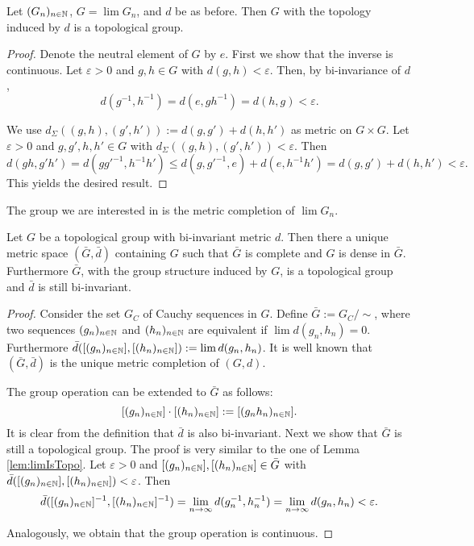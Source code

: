 \begin{lemma}\label{lem:limIsTopo}
Let $(G_n)_{n\in\mathbb{N}}$, $G=\lim G_n$, and $d$ be as before. Then $G$ with the topology induced by $d$ is a topological group.
\end{lemma}
\begin{proof}
Denote the neutral element of $G$ by $e$. First we show that the inverse is continuous. Let $\varepsilon>0$ and $g,h\in G$ with $d(g,h)<\varepsilon$. Then, by bi-invariance of $d$,
\[d(g^{-1},h^{-1})=d(e,gh^{-1})=d(h,g)<\varepsilon.\]

We use $d_\Sigma((g,h),(g',h')):=d(g,g')+d(h,h')$ as metric on $G\times G$. Let $\varepsilon>0$ and $g,g',h,h'\in G$ with $d_\Sigma((g,h),(g',h'))<\varepsilon$. Then
\[d(gh,g'h')=d(gg'^{-1},h^{-1}h')\leq d(g,g'^{-1},e)+d(e,h^{-1}h')=d(g,g')+d(h,h')<\varepsilon.\]
This yields the desired result.
\end{proof}


The group we are interested in is the metric completion of $\lim G_n$. 
\begin{lemma}\label{lem:climIsTopo}
Let $G$ be a topological group with bi-invariant metric $d$. Then there a unique metric space $(\bar G,\bar d)$ containing $G$ such that $\bar G$ is complete and $G$ is dense in $\bar G$. Furthermore $\bar G$, with the group structure induced by $G$, is a topological group and $\bar d$ is still bi-invariant.
\end{lemma}
\begin{proof}
Consider the set $G_C$ of Cauchy sequences in $G$. Define $\bar G:=G_C/\sim$, where two sequences $(g_n)_{n\in\mathbb{N}}$ and $(h_n)_{n\in\mathbb{N}}$ are equivalent if $\lim d(g_n,h_n)=0$. Furthermore $\bar d([(g_n)_{n\in\mathbb{N}}],[(h_n)_{n\in\mathbb{N}}]):=\lim d(g_n,h_n)$. It is well known that $(\bar G,\bar d)$ is the unique metric completion of $(G,d)$.

The group operation can be extended to $\bar G$ as follows:
\[[(g_n)_{n\in\mathbb{N}}]\cdot[(h_n)_{n\in\mathbb{N}}]:=[(g_nh_n)_{n\in\mathbb{N}}].\]
It is clear from the definition that $\bar d$ is also bi-invariant. Next we show that $\bar G$ is still a topological group. 
The proof is very similar to the one of Lemma \ref{lem:limIsTopo}.
Let $\varepsilon>0$ and $[(g_n)_{n\in\mathbb{N}}],[(h_n)_{n\in\mathbb{N}}]\in\bar G$ with $\bar d([(g_n)_{n\in\mathbb{N}}],[(h_n)_{n\in\mathbb{N}}])<\varepsilon$. Then
\[\bar d([(g_n)_{n\in\mathbb{N}}]^{-1},[(h_n)_{n\in\mathbb{N}}]^{-1})=\lim_{n\to\infty} d(g_n^{-1},h_n^{-1})=\lim_{n\to\infty} d(g_n,h_n)<\varepsilon. \]

Analogously, we obtain that the group operation is continuous.
\end{proof}

